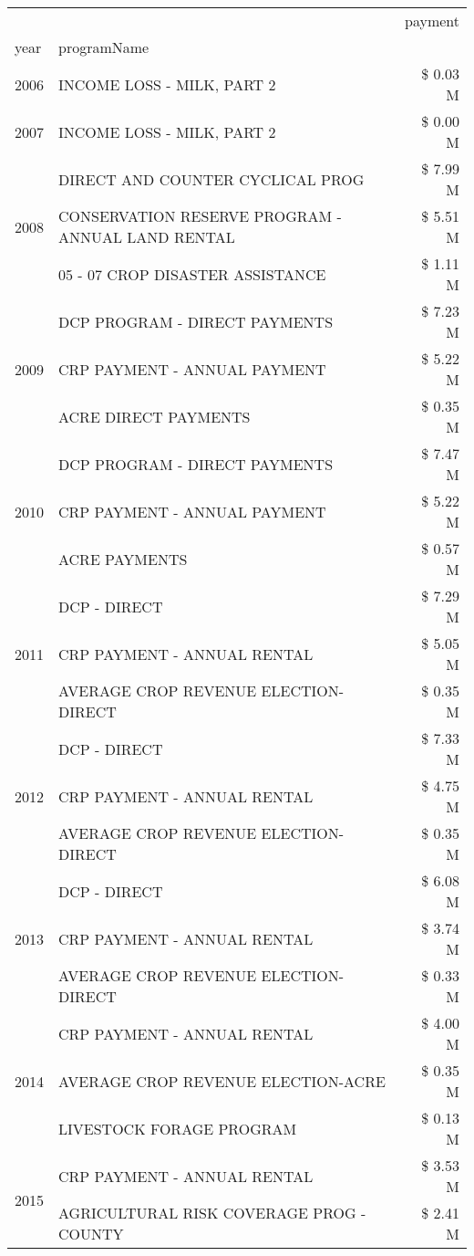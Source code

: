 \begin{tabular}{llr}
\toprule
 &  & payment \\
year & programName &  \\
\midrule
2006 & INCOME LOSS - MILK, PART 2 & \$ 0.03 M \\
\cline{1-3}
2007 & INCOME LOSS - MILK, PART 2 & \$ 0.00 M \\
\cline{1-3}
\multirow[t]{3}{*}{2008} & DIRECT AND COUNTER CYCLICAL PROG & \$ 7.99 M \\
 & CONSERVATION RESERVE PROGRAM - ANNUAL LAND RENTAL & \$ 5.51 M \\
 & 05 - 07 CROP DISASTER ASSISTANCE & \$ 1.11 M \\
\cline{1-3}
\multirow[t]{3}{*}{2009} & DCP PROGRAM - DIRECT PAYMENTS & \$ 7.23 M \\
 & CRP PAYMENT - ANNUAL PAYMENT & \$ 5.22 M \\
 & ACRE DIRECT PAYMENTS & \$ 0.35 M \\
\cline{1-3}
\multirow[t]{3}{*}{2010} & DCP PROGRAM - DIRECT PAYMENTS & \$ 7.47 M \\
 & CRP PAYMENT - ANNUAL PAYMENT & \$ 5.22 M \\
 & ACRE PAYMENTS & \$ 0.57 M \\
\cline{1-3}
\multirow[t]{3}{*}{2011} & DCP - DIRECT & \$ 7.29 M \\
 & CRP PAYMENT - ANNUAL RENTAL & \$ 5.05 M \\
 & AVERAGE CROP REVENUE ELECTION-DIRECT & \$ 0.35 M \\
\cline{1-3}
\multirow[t]{3}{*}{2012} & DCP - DIRECT & \$ 7.33 M \\
 & CRP PAYMENT - ANNUAL RENTAL & \$ 4.75 M \\
 & AVERAGE CROP REVENUE ELECTION-DIRECT & \$ 0.35 M \\
\cline{1-3}
\multirow[t]{3}{*}{2013} & DCP - DIRECT & \$ 6.08 M \\
 & CRP PAYMENT - ANNUAL RENTAL & \$ 3.74 M \\
 & AVERAGE CROP REVENUE ELECTION-DIRECT & \$ 0.33 M \\
\cline{1-3}
\multirow[t]{3}{*}{2014} & CRP PAYMENT - ANNUAL RENTAL & \$ 4.00 M \\
 & AVERAGE CROP REVENUE ELECTION-ACRE & \$ 0.35 M \\
 & LIVESTOCK FORAGE PROGRAM & \$ 0.13 M \\
\cline{1-3}
\multirow[t]{3}{*}{2015} & CRP PAYMENT - ANNUAL RENTAL & \$ 3.53 M \\
 & AGRICULTURAL RISK COVERAGE PROG - COUNTY & \$ 2.41 M \\

\end{tabular}
